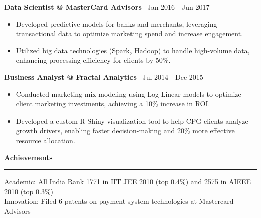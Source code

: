 \documentclass[a4paper,10pt]{article}
\begin{document}
\textbf{\large Data Scientist @ MasterCard Advisors} \hfill \faCalendar \, Jan 2016 - Jun 2017
\begin{itemize}
    \item Developed predictive models for banks and merchants, leveraging transactional data to optimize marketing spend and increase engagement.
    \item Utilized big data technologies (Spark, Hadoop) to handle high-volume data, enhancing processing efficiency for clients by 50\%.
\end{itemize}

\textbf{\large Business Analyst @ Fractal Analytics} \hfill \faCalendar \, Jul 2014 - Dec 2015
\begin{itemize}
    \item Conducted marketing mix modeling using Log-Linear models to optimize client marketing investments, achieving a 10\% increase in ROI.
    \item Developed a custom R Shiny visualization tool to help CPG clients analyze growth drivers, enabling faster decision-making and 20\% more effective resource allocation.
\end{itemize}

\vspace{4mm}

\textbf{\LARGE Achievements} \\
\vspace{1mm}
\rule{\textwidth}{0.4pt}
Academic: All India Rank 1771 in IIT JEE 2010 (top 0.4\%) and 2575 in AIEEE 2010 (top 0.3\%) \\
Innovation: Filed 6 patents on payment system technologies at Mastercard Advisors
\end{document}
